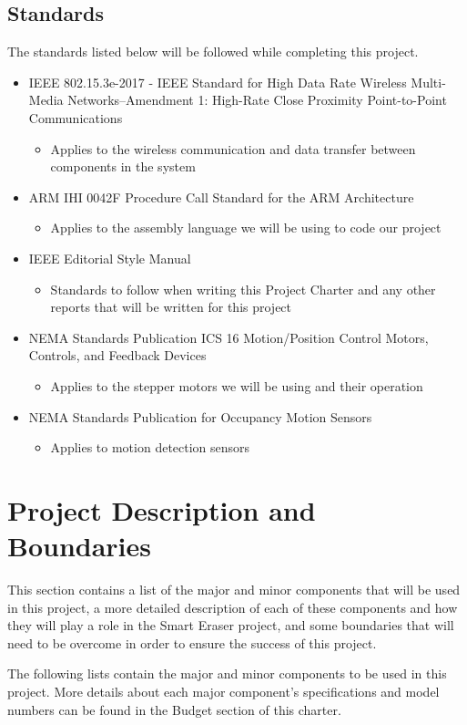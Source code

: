 \subsection{Standards}
\setlength{\parindent}{2.5ex} The standards listed below will be followed while completing this project.
\begin{itemize}
	\item IEEE 802.15.3e-2017 - IEEE Standard for High Data Rate Wireless Multi-Media Networks--Amendment 1: High-Rate Close Proximity Point-to-Point Communications
	\begin{itemize}
		\item Applies to the wireless communication and data transfer between components in the system \cite{wifiStandards}
	\end{itemize}
	\item ARM IHI 0042F Procedure Call Standard for the ARM Architecture
	\begin{itemize}
		\item Applies to the assembly language we will be using to code our project
		\cite{armStandards}
	\end{itemize}
	\item IEEE Editorial Style Manual
	\begin{itemize}
		\item Standards to follow when writing this Project Charter and any other reports that will be written for this project \cite{ieee}
	\end{itemize}
	\item NEMA Standards Publication ICS 16 Motion/Position Control Motors, Controls, and Feedback Devices
	\begin{itemize}
		\item Applies to the stepper motors we will be using and their operation \cite{nema1}
	\end{itemize}
	\item NEMA Standards Publication for Occupancy Motion Sensors
	\begin{itemize}
		\item Applies to motion detection sensors \cite{nema2}
	\end{itemize}
\end{itemize}
 
\section{Project Description and Boundaries}
This section contains a list of the major and minor components that will be used in this project, a more detailed description of each of these components and how they will play a role in the Smart Eraser project, and some boundaries that will need to be overcome in order to ensure the success of this project. \par
\setlength{\parindent}{2.5ex}The following lists contain the major and minor components to be used in this project. More details about each major component's specifications and model numbers can be found in the Budget section of this charter.\\


